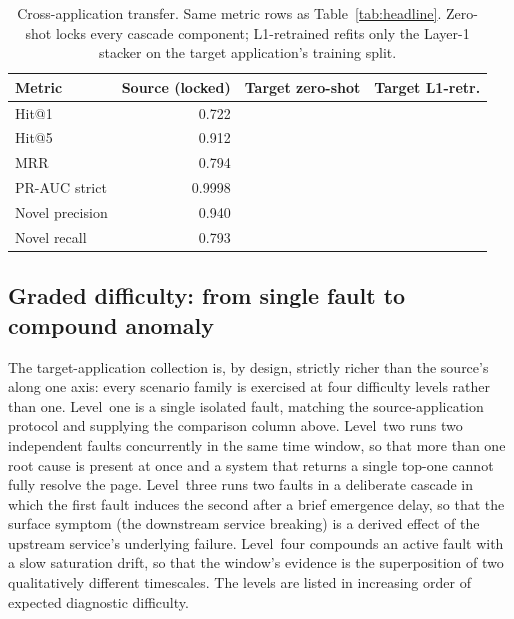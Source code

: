 
\begin{table}[ht]
  \centering
  \caption{Cross-application transfer. Same metric rows as Table~\ref{tab:headline}. Zero-shot locks every cascade component; L1-retrained refits only the Layer-1 stacker on the target application's training split.}
  \label{tab:cross-app-headline}
  \small
  \begin{tabular}{lrrr}
    \toprule
    Metric & Source (locked) & Target zero-shot & Target L1-retr. \\
    \midrule
    Hit@1                 & 0.722  & \todo{}        & \todo{} \\
    Hit@5                 & 0.912  & \todo{}        & \todo{} \\
    MRR                   & 0.794  & \todo{}        & \todo{} \\
    PR-AUC strict         & 0.9998 & \todo{}        & \todo{} \\
    Novel precision       & 0.940  & \todo{}        & \todo{} \\
    Novel recall          & 0.793  & \todo{}        & \todo{} \\
    \bottomrule
  \end{tabular}
\end{table}

\subsection{Graded difficulty: from single fault to compound anomaly}
\label{sec:cross-app:graded}

The target-application collection is, by design, strictly richer than the source's along one axis: every scenario family is exercised at four difficulty levels rather than one. Level~one is a single isolated fault, matching the source-application protocol and supplying the comparison column above. Level~two runs two independent faults concurrently in the same time window, so that more than one root cause is present at once and a system that returns a single top-one cannot fully resolve the page. Level~three runs two faults in a deliberate cascade in which the first fault induces the second after a brief emergence delay, so that the surface symptom (the downstream service breaking) is a derived effect of the upstream service's underlying failure. Level~four compounds an active fault with a slow saturation drift, so that the window's evidence is the superposition of two qualitatively different timescales. The levels are listed in increasing order of expected diagnostic difficulty.

